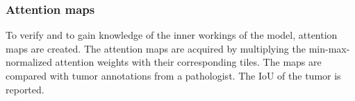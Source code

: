 \subsubsection{Attention maps}
To verify and to gain knowledge of the inner workings of the model, attention maps are created.
The attention maps are acquired by multiplying the min-max-normalized attention weights with their corresponding tiles.
The maps are compared with tumor annotations from a pathologist.
The IoU of the tumor is reported.

